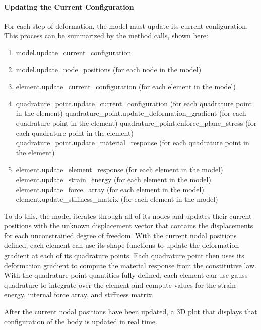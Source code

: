 \documentclass[]{spie}  %
\begin{document}
\paragraph{Updating the Current Configuration}
For each step of deformation, the model must update its current configuration. This process can be summarized by the method calls, shown here:
\begin{enumerate}
	\item model.update\_current\_configuration
	\item model.update\_node\_positions \hfill (for each node in the model)
	\item element.update\_current\_configuration \hfill (for each element in the model)
	\item quadrature\_point.update\_current\_configuration \hfill (for each quadrature point in the element)
	\subitem quadrature\_point.update\_deformation\_gradient \hfill (for each quadrature point in the element)
	\subitem quadrature\_point.enforce\_plane\_stress \hfill (for each quadrature point in the element)
	\subitem quadrature\_point.update\_material\_response \hfill (for each quadrature point in the element)
	\item element.update\_element\_response \hfill (for each element in the model)
	\subitem element.update\_strain\_energy \hfill (for each element in the model)
	\subitem element.update\_force\_array \hfill (for each element in the model)
	\subitem element.update\_stiffness\_matrix \hfill (for each element in the model)
\end{enumerate}

To do this, the model iterates through all of its nodes and updates their current positions with the unknown displacement vector that contains the displacements for each unconstrained degree of freedom. With the current nodal positions defined, each element can use its shape functions to update the deformation gradient at each of its quadrature points. Each quadrature point then uses its deformation gradient to compute the material response from the constitutive law. With the quadrature point quantities fully defined, each element can use gauss quadrature to integrate over the element and compute values for the strain energy, internal force array, and stiffness matrix.

After the current nodal positions have been updated, a 3D plot that displays that configuration of the body is updated in real time. 
\end{document}
